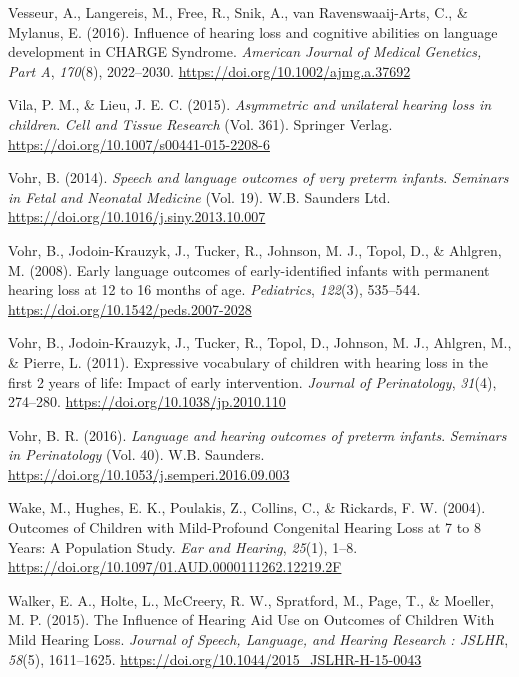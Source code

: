 \documentclass[
  english,
  man]{apa6}
\begin{document}
\leavevmode\hypertarget{ref-vesseur2016}{}%
Vesseur, A., Langereis, M., Free, R., Snik, A., van Ravenswaaij-Arts, C., \& Mylanus, E. (2016). Influence of hearing loss and cognitive abilities on language development in CHARGE Syndrome. \emph{American Journal of Medical Genetics, Part A}, \emph{170}(8), 2022--2030. \url{https://doi.org/10.1002/ajmg.a.37692}

\leavevmode\hypertarget{ref-vila2015}{}%
Vila, P. M., \& Lieu, J. E. C. (2015). \emph{Asymmetric and unilateral hearing loss in children}. \emph{Cell and Tissue Research} (Vol. 361). Springer Verlag. \url{https://doi.org/10.1007/s00441-015-2208-6}

\leavevmode\hypertarget{ref-vohr2014}{}%
Vohr, B. (2014). \emph{Speech and language outcomes of very preterm infants}. \emph{Seminars in Fetal and Neonatal Medicine} (Vol. 19). W.B. Saunders Ltd. \url{https://doi.org/10.1016/j.siny.2013.10.007}

\leavevmode\hypertarget{ref-vohr2008}{}%
Vohr, B., Jodoin-Krauzyk, J., Tucker, R., Johnson, M. J., Topol, D., \& Ahlgren, M. (2008). Early language outcomes of early-identified infants with permanent hearing loss at 12 to 16 months of age. \emph{Pediatrics}, \emph{122}(3), 535--544. \url{https://doi.org/10.1542/peds.2007-2028}

\leavevmode\hypertarget{ref-vohr2011}{}%
Vohr, B., Jodoin-Krauzyk, J., Tucker, R., Topol, D., Johnson, M. J., Ahlgren, M., \& Pierre, L. (2011). Expressive vocabulary of children with hearing loss in the first 2 years of life: Impact of early intervention. \emph{Journal of Perinatology}, \emph{31}(4), 274--280. \url{https://doi.org/10.1038/jp.2010.110}

\leavevmode\hypertarget{ref-vohr2016}{}%
Vohr, B. R. (2016). \emph{Language and hearing outcomes of preterm infants}. \emph{Seminars in Perinatology} (Vol. 40). W.B. Saunders. \url{https://doi.org/10.1053/j.semperi.2016.09.003}

\leavevmode\hypertarget{ref-wake2004}{}%
Wake, M., Hughes, E. K., Poulakis, Z., Collins, C., \& Rickards, F. W. (2004). Outcomes of Children with Mild-Profound Congenital Hearing Loss at 7 to 8 Years: A Population Study. \emph{Ear and Hearing}, \emph{25}(1), 1--8. \url{https://doi.org/10.1097/01.AUD.0000111262.12219.2F}

\leavevmode\hypertarget{ref-walker2015}{}%
Walker, E. A., Holte, L., McCreery, R. W., Spratford, M., Page, T., \& Moeller, M. P. (2015). The Influence of Hearing Aid Use on Outcomes of Children With Mild Hearing Loss. \emph{Journal of Speech, Language, and Hearing Research : JSLHR}, \emph{58}(5), 1611--1625. \url{https://doi.org/10.1044/2015_JSLHR-H-15-0043}
\end{document}
